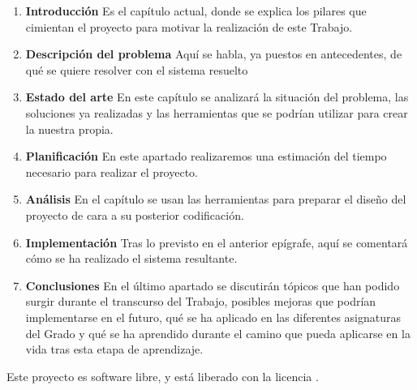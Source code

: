 \begin{enumerate}[C{a}pítulo 1.- ]
	\item \textbf{Introducción} Es el capítulo actual, donde se explica los pilares que cimientan el proyecto para motivar la realización de este Trabajo.
	\item \textbf{Descripción del problema} Aquí se habla, ya puestos en antecedentes, de qué se quiere resolver con el sistema resuelto
	\item \textbf{Estado del arte} En este capítulo se analizará la situación del problema, las soluciones ya realizadas y las herramientas que se podrían utilizar para crear la nuestra propia.
	\item \textbf{Planificación} En este apartado realizaremos una estimación del tiempo necesario para realizar el proyecto.
	\item \textbf{Análisis} En el capítulo se usan las herramientas para preparar el diseño del proyecto de cara a su posterior codificación.
	\item \textbf{Implementación} Tras lo previsto en el anterior epígrafe, aquí se comentará cómo se ha realizado el sistema resultante.
	\item \textbf{Conclusiones} En el último apartado se discutirán tópicos que han podido surgir durante el transcurso del Trabajo, posibles mejoras que podrían implementarse en el futuro, qué se ha aplicado en las diferentes asignaturas del Grado y qué se ha aprendido durante el camino que pueda aplicarse en la vida tras esta etapa de aprendizaje.
\end{enumerate}

Este proyecto es software libre, y está liberado con la licencia \cite{gplv3}.